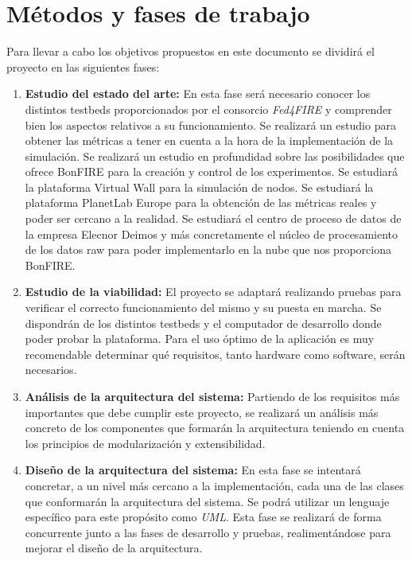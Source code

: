 
\section{Métodos y fases de trabajo}
\label{sec:metodos}

Para llevar a cabo los objetivos propuestos en este documento se dividirá el proyecto en las siguientes fases:

\begin{enumerate}
\item \textbf{Estudio del estado del arte:} En esta fase será necesario conocer los distintos testbeds proporcionados por el consorcio \emph{Fed4FIRE} y comprender bien  los aspectos relativos a su funcionamiento.
Se realizará un estudio para obtener las métricas a tener en cuenta a la hora de la implementación de la simulación.
Se realizará un estudio en profundidad sobre las posibilidades que ofrece BonFIRE para la creación y control de los experimentos.
Se estudiará la plataforma Virtual Wall para la simulación de nodos.
Se estudiará la plataforma PlanetLab Europe para la obtención de las métricas reales y poder ser cercano a la realidad.
Se estudiará el centro de proceso de datos de la empresa Elecnor Deimos y más concretamente el núcleo de procesamiento de los datos raw para poder implementarlo en la nube que nos proporciona BonFIRE.



\item\textbf{Estudio de la viabilidad:}
El proyecto se adaptará realizando pruebas para verificar el correcto funcionamiento del mismo y su
puesta en marcha. Se dispondrán de los distintos testbeds y el computador de desarrollo donde poder probar la plataforma. Para el uso óptimo de la aplicación
es muy recomendable determinar qué requisitos, tanto hardware como software, serán necesarios.

\item\textbf{Análisis de la arquitectura del sistema:}
Partiendo de los requisitos más importantes que debe cumplir este proyecto, se realizará un análisis más concreto de los componentes
que formarán la arquitectura teniendo en cuenta los principios de modularización y extensibilidad.

\item\textbf{Diseño de la arquitectura del sistema:}
En esta fase se intentará concretar, a un nivel más cercano a la implementación, cada una de las clases que conformarán la arquitectura del sistema.
Se podrá utilizar un lenguaje específico para este propósito como \emph{UML}. Esta fase se realizará de forma concurrente junto a las fases de desarrollo
y pruebas, realimentándose para mejorar el diseño de la arquitectura.



\end{enumerate}
